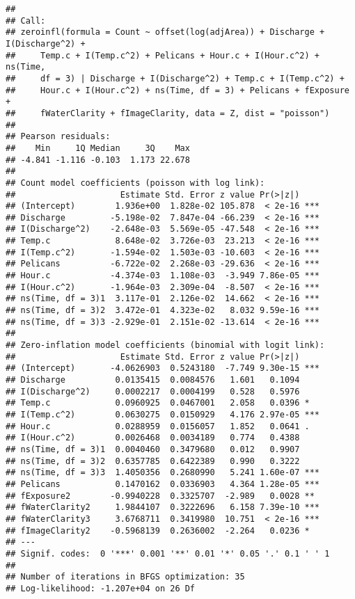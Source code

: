 \documentclass[]{article}
\begin{document}
\begin{verbatim}
## 
## Call:
## zeroinfl(formula = Count ~ offset(log(adjArea)) + Discharge + I(Discharge^2) + 
##     Temp.c + I(Temp.c^2) + Pelicans + Hour.c + I(Hour.c^2) + ns(Time, 
##     df = 3) | Discharge + I(Discharge^2) + Temp.c + I(Temp.c^2) + 
##     Hour.c + I(Hour.c^2) + ns(Time, df = 3) + Pelicans + fExposure + 
##     fWaterClarity + fImageClarity, data = Z, dist = "poisson")
## 
## Pearson residuals:
##    Min     1Q Median     3Q    Max 
## -4.841 -1.116 -0.103  1.173 22.678 
## 
## Count model coefficients (poisson with log link):
##                     Estimate Std. Error z value Pr(>|z|)    
## (Intercept)        1.936e+00  1.828e-02 105.878  < 2e-16 ***
## Discharge         -5.198e-02  7.847e-04 -66.239  < 2e-16 ***
## I(Discharge^2)    -2.648e-03  5.569e-05 -47.548  < 2e-16 ***
## Temp.c             8.648e-02  3.726e-03  23.213  < 2e-16 ***
## I(Temp.c^2)       -1.594e-02  1.503e-03 -10.603  < 2e-16 ***
## Pelicans          -6.722e-02  2.268e-03 -29.636  < 2e-16 ***
## Hour.c            -4.374e-03  1.108e-03  -3.949 7.86e-05 ***
## I(Hour.c^2)       -1.964e-03  2.309e-04  -8.507  < 2e-16 ***
## ns(Time, df = 3)1  3.117e-01  2.126e-02  14.662  < 2e-16 ***
## ns(Time, df = 3)2  3.472e-01  4.323e-02   8.032 9.59e-16 ***
## ns(Time, df = 3)3 -2.929e-01  2.151e-02 -13.614  < 2e-16 ***
## 
## Zero-inflation model coefficients (binomial with logit link):
##                     Estimate Std. Error z value Pr(>|z|)    
## (Intercept)       -4.0626903  0.5243180  -7.749 9.30e-15 ***
## Discharge          0.0135415  0.0084576   1.601   0.1094    
## I(Discharge^2)     0.0002217  0.0004199   0.528   0.5976    
## Temp.c             0.0960925  0.0467001   2.058   0.0396 *  
## I(Temp.c^2)        0.0630275  0.0150929   4.176 2.97e-05 ***
## Hour.c             0.0288959  0.0156057   1.852   0.0641 .  
## I(Hour.c^2)        0.0026468  0.0034189   0.774   0.4388    
## ns(Time, df = 3)1  0.0040460  0.3479680   0.012   0.9907    
## ns(Time, df = 3)2  0.6357785  0.6422389   0.990   0.3222    
## ns(Time, df = 3)3  1.4050356  0.2680990   5.241 1.60e-07 ***
## Pelicans           0.1470162  0.0336903   4.364 1.28e-05 ***
## fExposure2        -0.9940228  0.3325707  -2.989   0.0028 ** 
## fWaterClarity2     1.9844107  0.3222696   6.158 7.39e-10 ***
## fWaterClarity3     3.6768711  0.3419980  10.751  < 2e-16 ***
## fImageClarity2    -0.5968139  0.2636002  -2.264   0.0236 *  
## ---
## Signif. codes:  0 '***' 0.001 '**' 0.01 '*' 0.05 '.' 0.1 ' ' 1 
## 
## Number of iterations in BFGS optimization: 35 
## Log-likelihood: -1.207e+04 on 26 Df
\end{verbatim}
\end{document}
